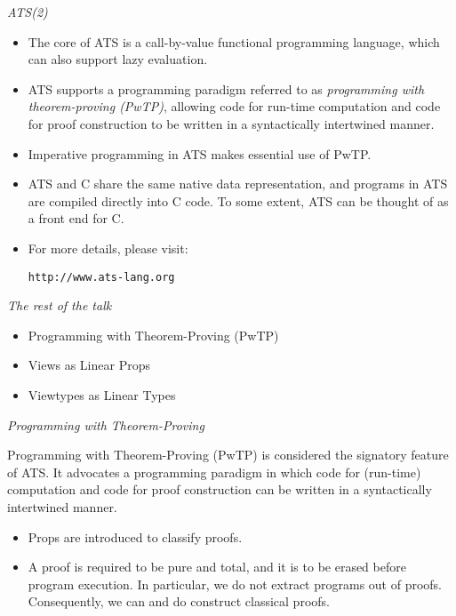 \documentclass[pdf]{prosper}
\begin{document}
\begin{slide}{\em ATS(2)}
\begin{itemize}
\item
The core of ATS is a call-by-value functional programming language,
which can also support lazy evaluation.
\item
ATS supports a programming paradigm referred to as {\em programming with
theorem-proving (PwTP)}, allowing code for run-time computation and
code for proof construction to be written in a syntactically intertwined
manner.
\item
Imperative programming in ATS makes essential use of PwTP.
\item
ATS and C share the same native data representation, and
programs in ATS are compiled directly into C code. To some extent, ATS
can be thought of as a front end for C.
\item
For more details, please visit:
\begin{center}
\texttt{http://www.ats-lang.org}
\end{center}
\end{itemize}
\end{slide}
\begin{slide}{\em The rest of the talk}
\begin{itemize}
\item Programming with Theorem-Proving (PwTP)
\item Views as Linear Props
\item Viewtypes as Linear Types
\end{itemize}
\end{slide}
\begin{slide}{\em Programming with Theorem-Proving}

Programming with Theorem-Proving (PwTP) is considered the signatory
feature of ATS. It advocates a programming paradigm in which code for
(run-time) computation and code for proof construction can be written in a
syntactically intertwined manner.

\begin{itemize}
\item
Props are introduced to classify proofs.
\item
A proof is required to be pure and total, and it is to be erased before
program execution. In particular, we do not extract programs out of
proofs. Consequently, we can and do construct classical proofs.
\end{itemize}
\end{slide}
\end{document}
